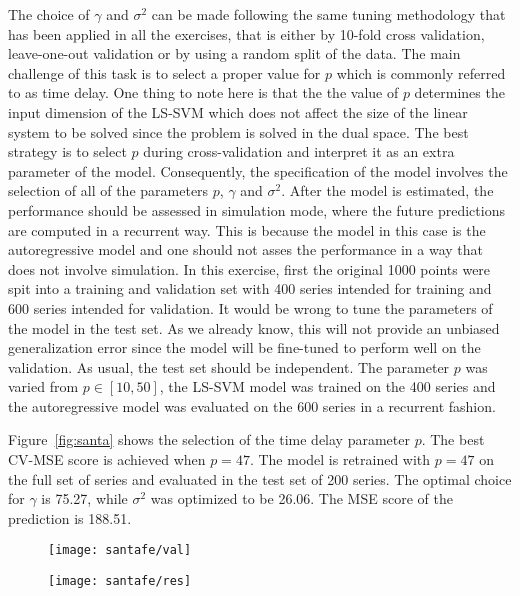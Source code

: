\documentclass[conference,compsoc]{IEEEtran}
\begin{document}
The choice of $\gamma$ and $\sigma^2$ can be made following the same tuning methodology that has been applied in all the exercises, that is either by 10-fold cross validation, leave-one-out validation or by using a random split of the data.  The main challenge of this task is to select a proper value for $p$ which is commonly referred to as time delay. One thing to note here is that the the value of $p$ determines the input dimension of the LS-SVM which does not affect the size of the linear system to be solved since the problem is solved in the dual space. The best strategy is to select $p$ during cross-validation and interpret it as an extra parameter of the model. Consequently, the specification of the model involves the selection of all of the parameters $p$, $\gamma$ and $\sigma^2$. After the model is estimated, the performance should be assessed in simulation mode, where the future predictions are computed in a recurrent way. This is because the model in this case is the autoregressive model and one should not asses the performance in a way that does not involve simulation. In this exercise, first the original 1000 points were spit into a training and validation set with 400 series intended for training and 600 series intended for validation. It would be wrong to tune the parameters of the model in the test set. As we already know, this will not provide an unbiased generalization error since the model will be fine-tuned to perform well on the validation. As usual, the test set should be independent. The parameter $p$ was varied from $p \in [10,50]$, the LS-SVM model was trained on the 400 series and the autoregressive model was evaluated on the 600 series in a recurrent fashion. 

Figure~\ref{fig:santa} shows the selection of the time delay parameter $p$. The best CV-MSE score is achieved when $p=47$. The model is retrained with $p=47$ on the full set of series and evaluated in the test set of 200 series. The optimal choice for $\gamma$ is 75.27, while $\sigma^2$ was optimized to be 26.06. The MSE score of the prediction is 188.51.   

\begin{figure*}[]
\centering
        \begin{subfigure}{0.45\linewidth}
            \texttt{[image: santafe/val]}
            
       
      \end{subfigure} 
      \begin{subfigure}{0.45\linewidth}
            \texttt{[image: santafe/res]}
            
       
      \end{subfigure}              
  \caption{Santa Fe Time Series Prediction}   
    \label{fig:santa}
    \end{figure*}
\end{document}
